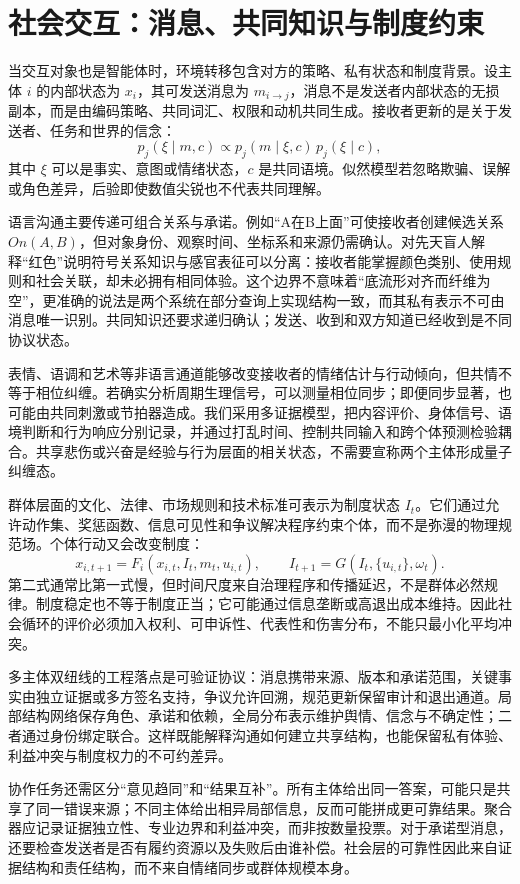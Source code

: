 \section{社会交互：消息、共同知识与制度约束}
\label{sec:section_5506}

当交互对象也是智能体时，环境转移包含对方的策略、私有状态和制度背景。设主体 $i$ 的内部状态为 $x_i$，其可发送消息为 $m_{i\rightarrow j}$，消息不是发送者内部状态的无损副本，而是由编码策略、共同词汇、权限和动机共同生成。接收者更新的是关于发送者、任务和世界的信念：
\[
p_j(\xi\mid m,c)\propto p_j(m\mid \xi,c)\,p_j(\xi\mid c),
\]
其中 $\xi$ 可以是事实、意图或情绪状态，$c$ 是共同语境。似然模型若忽略欺骗、误解或角色差异，后验即使数值尖锐也不代表共同理解。

语言沟通主要传递可组合关系与承诺。例如“A在B上面”可使接收者创建候选关系 $On(A,B)$，但对象身份、观察时间、坐标系和来源仍需确认。对先天盲人解释“红色”说明符号关系知识与感官表征可以分离：接收者能掌握颜色类别、使用规则和社会关联，却未必拥有相同体验。这个边界不意味着“底流形对齐而纤维为空”，更准确的说法是两个系统在部分查询上实现结构一致，而其私有表示不可由消息唯一识别。共同知识还要求递归确认；发送、收到和双方知道已经收到是不同协议状态。

表情、语调和艺术等非语言通道能够改变接收者的情绪估计与行动倾向，但共情不等于相位纠缠。若确实分析周期生理信号，可以测量相位同步；即便同步显著，也可能由共同刺激或节拍器造成。我们采用多证据模型，把内容评价、身体信号、语境判断和行为响应分别记录，并通过打乱时间、控制共同输入和跨个体预测检验耦合。共享悲伤或兴奋是经验与行为层面的相关状态，不需要宣称两个主体形成量子纠缠态。

群体层面的文化、法律、市场规则和技术标准可表示为制度状态 $I_t$。它们通过允许动作集、奖惩函数、信息可见性和争议解决程序约束个体，而不是弥漫的物理规范场。个体行动又会改变制度：
\[
x_{i,t+1}=F_i(x_{i,t},I_t,m_t,u_{i,t}),\qquad
I_{t+1}=G(I_t,\{u_{i,t}\},\omega_t).
\]
第二式通常比第一式慢，但时间尺度来自治理程序和传播延迟，不是群体必然规律。制度稳定也不等于制度正当；它可能通过信息垄断或高退出成本维持。因此社会循环的评价必须加入权利、可申诉性、代表性和伤害分布，不能只最小化平均冲突。

多主体双纽线的工程落点是可验证协议：消息携带来源、版本和承诺范围，关键事实由独立证据或多方签名支持，争议允许回溯，规范更新保留审计和退出通道。局部结构网络保存角色、承诺和依赖，全局分布表示维护舆情、信念与不确定性；二者通过身份绑定联合。这样既能解释沟通如何建立共享结构，也能保留私有体验、利益冲突与制度权力的不可约差异。

协作任务还需区分“意见趋同”和“结果互补”。所有主体给出同一答案，可能只是共享了同一错误来源；不同主体给出相异局部信息，反而可能拼成更可靠结果。聚合器应记录证据独立性、专业边界和利益冲突，而非按数量投票。对于承诺型消息，还要检查发送者是否有履约资源以及失败后由谁补偿。社会层的可靠性因此来自证据结构和责任结构，而不来自情绪同步或群体规模本身。

